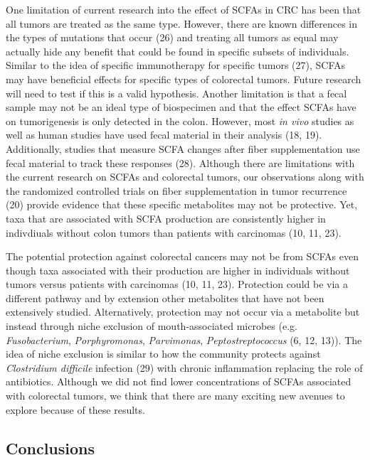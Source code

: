 \documentclass[11pt,]{article}
\begin{document}
One limitation of current research into the effect of SCFAs in CRC has
been that all tumors are treated as the same type. However, there are
known differences in the types of mutations that occur (26) and treating
all tumors as equal may actually hide any benefit that could be found in
specific subsets of individuals. Similar to the idea of specific
immunotherapy for specific tumors (27), SCFAs may have beneficial
effects for specific types of colorectal tumors. Future research will
need to test if this is a valid hypothesis. Another limitation is that a
fecal sample may not be an ideal type of biospecimen and that the effect
SCFAs have on tumorigenesis is only detected in the colon. However, most
\emph{in vivo} studies as well as human studies have used fecal material
in their analysis (18, 19). Additionally, studies that measure SCFA
changes after fiber supplementation use fecal material to track these
responses (28). Although there are limitations with the current research
on SCFAs and colorectal tumors, our observations along with the
randomized controlled trials on fiber supplementation in tumor
recurrence (20) provide evidence that these specific metabolites may not
be protective. Yet, taxa that are associated with SCFA production are
consistently higher in indivdiuals without colon tumors than patients
with carcinomas (10, 11, 23).

The potential protection against colorectal cancers may not be from
SCFAs even though taxa associated with their production are higher in
individuals without tumors versus patients with carcinomas (10, 11, 23).
Protection could be via a different pathway and by extension other
metabolites that have not been extensively studied. Alternatively,
protection may not occur via a metabolite but instead through niche
exclusion of mouth-associated microbes (e.g. \emph{Fusobacterium},
\emph{Porphyromonas}, \emph{Parvimonas}, \emph{Peptostreptococcus} (6,
12, 13)). The idea of niche exclusion is similar to how the community
protects against \emph{Clostridium difficile} infection (29) with
chronic inflammation replacing the role of antibiotics. Although we did
not find lower concentrations of SCFAs associated with colorectal
tumors, we think that there are many exciting new avenues to explore
because of these results.

\newpage

\subsection{Conclusions}\label{conclusions}
\end{document}
